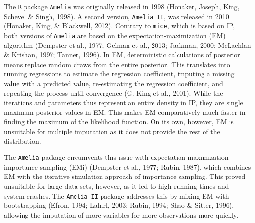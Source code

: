 \documentclass[12pt,econ]{sources/authesis}
\begin{document}
The \texttt{R} package \texttt{Amelia} was originally released in 1998 (Honaker, Joseph, King, Scheve, \& Singh, 1998). A second version, \texttt{Amelia\ II}, was released in 2010 (Honaker, King, \& Blackwell, 2012). Contrary to \texttt{mice}, which is based on IP, both versions of \texttt{Amelia} are based on the expectation-maximization (EM) algorithm (Dempster et al., 1977; Gelman et al., 2013; Jackman, 2000; McLachlan \& Krishan, 1997; Tanner, 1996). In EM, deterministic calculations of posterior means replace random draws from the entire posterior. This translates into running regressions to estimate the regression coefficient, imputing a missing value with a predicted value, re-estimating the regression coefficient, and repeating the process until convergence (G. King et al., 2001). While the iterations and parameters thus represent an entire density in IP, they are single maximum posterior values in EM. This makes EM comparatively much faster in finding the maximum of the likelihood function. On its own, however, EM is unsuitable for multiple imputation as it does not provide the rest of the distribution.

The \texttt{Amelia} package circumvents this issue with expectation-maximization importance sampling (EMi) (Dempster et al., 1977; Rubin, 1987), which combines EM with the iterative simulation approach of importance sampling. This proved unsuitable for large data sets, however, as it led to high running times and system crashes. The \texttt{Amelia\ II} package addresses this by mixing EM with bootstrapping (Efron, 1994; Lahlrl, 2003; Rubin, 1994; Shao \& Sitter, 1996), allowing the imputation of more variables for more observations more quickly.
\end{document}
